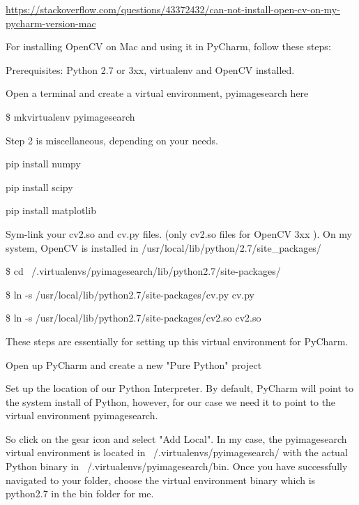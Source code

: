 \documentclass{article}
\begin{document}
\href{https://stackoverflow.com/questions/43372432/can-not-install-open-cv-on-my-pycharm-version-mac}{https://stackoverflow.com/questions/43372432/can-not-install-open-cv-on-my-pycharm-version-mac}

For installing OpenCV on Mac and using it in PyCharm, follow these steps:



Prerequisites: Python 2.7 or 3xx, virtualenv and OpenCV installed.



Open a terminal and create a virtual environment, pyimagesearch here



\$  mkvirtualenv pyimagesearch

Step 2 is miscellaneous, depending on your needs.



pip install numpy



pip install scipy



pip install matplotlib

Sym-link your cv2.so and cv.py files. (only cv2.so files for OpenCV 3xx ). On my system, OpenCV is installed in /usr/local/lib/python/2.7/site\_packages/



\$  cd ~/.virtualenvs/pyimagesearch/lib/python2.7/site-packages/



\$  ln -s /usr/local/lib/python2.7/site-packages/cv.py cv.py



\$  ln -s /usr/local/lib/python2.7/site-packages/cv2.so cv2.so

These steps are essentially for setting up this virtual environment for PyCharm.

Open up PyCharm and create a new "Pure Python" project



Set up the location of our Python Interpreter. By default, PyCharm will point to the system install of Python, however, for our case we need it to point to the virtual environment pyimagesearch.



So click on the gear icon and select "Add Local". In my case, the pyimagesearch  virtual environment is located in  ~/.virtualenvs/pyimagesearch/ with the actual Python binary in  ~/.virtualenvs/pyimagesearch/bin. Once you have successfully navigated to your folder, choose the virtual environment binary which is python2.7 in the bin folder for me.
\end{document}
